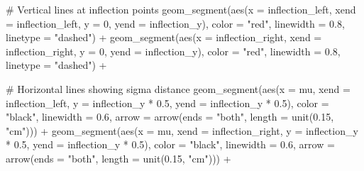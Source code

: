 \documentclass[
  letterpaper,
  DIV=11,
  numbers=noendperiod]{scrreprt}
\newenvironment{Shaded}{\begin{snugshade}}{\end{snugshade}}
\newcommand{\AttributeTok}[1]{\textcolor[rgb]{0.40,0.45,0.13}{#1}}
\newcommand{\CommentTok}[1]{\textcolor[rgb]{0.37,0.37,0.37}{#1}}
\newcommand{\DecValTok}[1]{\textcolor[rgb]{0.68,0.00,0.00}{#1}}
\newcommand{\FloatTok}[1]{\textcolor[rgb]{0.68,0.00,0.00}{#1}}
\newcommand{\FunctionTok}[1]{\textcolor[rgb]{0.28,0.35,0.67}{#1}}
\newcommand{\NormalTok}[1]{\textcolor[rgb]{0.00,0.23,0.31}{#1}}
\newcommand{\SpecialCharTok}[1]{\textcolor[rgb]{0.37,0.37,0.37}{#1}}
\newcommand{\StringTok}[1]{\textcolor[rgb]{0.13,0.47,0.30}{#1}}
\begin{document}
\begin{Shaded}
\begin{Highlighting}[]
  \CommentTok{\# Vertical lines at inflection points}
  \FunctionTok{geom\_segment}\NormalTok{(}\FunctionTok{aes}\NormalTok{(}\AttributeTok{x =}\NormalTok{ inflection\_left, }\AttributeTok{xend =}\NormalTok{ inflection\_left,}
                   \AttributeTok{y =} \DecValTok{0}\NormalTok{, }\AttributeTok{yend =}\NormalTok{ inflection\_y),}
               \AttributeTok{color =} \StringTok{"red"}\NormalTok{, }\AttributeTok{linewidth =} \FloatTok{0.8}\NormalTok{, }\AttributeTok{linetype =} \StringTok{"dashed"}\NormalTok{) }\SpecialCharTok{+}
  \FunctionTok{geom\_segment}\NormalTok{(}\FunctionTok{aes}\NormalTok{(}\AttributeTok{x =}\NormalTok{ inflection\_right, }\AttributeTok{xend =}\NormalTok{ inflection\_right,}
                   \AttributeTok{y =} \DecValTok{0}\NormalTok{, }\AttributeTok{yend =}\NormalTok{ inflection\_y),}
               \AttributeTok{color =} \StringTok{"red"}\NormalTok{, }\AttributeTok{linewidth =} \FloatTok{0.8}\NormalTok{, }\AttributeTok{linetype =} \StringTok{"dashed"}\NormalTok{) }\SpecialCharTok{+}
  
  \CommentTok{\# Horizontal lines showing sigma distance}
  \FunctionTok{geom\_segment}\NormalTok{(}\FunctionTok{aes}\NormalTok{(}\AttributeTok{x =}\NormalTok{ mu, }\AttributeTok{xend =}\NormalTok{ inflection\_left,}
                   \AttributeTok{y =}\NormalTok{ inflection\_y }\SpecialCharTok{*} \FloatTok{0.5}\NormalTok{, }\AttributeTok{yend =}\NormalTok{ inflection\_y }\SpecialCharTok{*} \FloatTok{0.5}\NormalTok{),}
               \AttributeTok{color =} \StringTok{"black"}\NormalTok{, }\AttributeTok{linewidth =} \FloatTok{0.6}\NormalTok{,}
               \AttributeTok{arrow =} \FunctionTok{arrow}\NormalTok{(}\AttributeTok{ends =} \StringTok{"both"}\NormalTok{, }\AttributeTok{length =} \FunctionTok{unit}\NormalTok{(}\FloatTok{0.15}\NormalTok{, }\StringTok{"cm"}\NormalTok{))) }\SpecialCharTok{+}
  \FunctionTok{geom\_segment}\NormalTok{(}\FunctionTok{aes}\NormalTok{(}\AttributeTok{x =}\NormalTok{ mu, }\AttributeTok{xend =}\NormalTok{ inflection\_right,}
                   \AttributeTok{y =}\NormalTok{ inflection\_y }\SpecialCharTok{*} \FloatTok{0.5}\NormalTok{, }\AttributeTok{yend =}\NormalTok{ inflection\_y }\SpecialCharTok{*} \FloatTok{0.5}\NormalTok{),}
               \AttributeTok{color =} \StringTok{"black"}\NormalTok{, }\AttributeTok{linewidth =} \FloatTok{0.6}\NormalTok{,}
               \AttributeTok{arrow =} \FunctionTok{arrow}\NormalTok{(}\AttributeTok{ends =} \StringTok{"both"}\NormalTok{, }\AttributeTok{length =} \FunctionTok{unit}\NormalTok{(}\FloatTok{0.15}\NormalTok{, }\StringTok{"cm"}\NormalTok{))) }\SpecialCharTok{+}
  

\end{Highlighting}
\end{Shaded}
\end{document}
